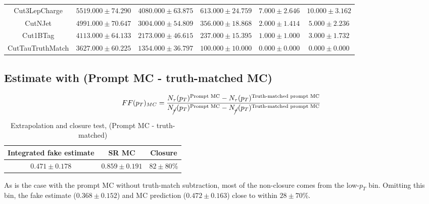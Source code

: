 \documentclass[11pt]{article}
\begin{document}
\begin{table}[htp]
{\begin{tabular}{|c|c|c|c|c|c|}
		Cut3LepCharge    &      $5519.000 \pm 74.290$ &      $4080.000 \pm 63.875$ &          $613.000 \pm 24.759$ &           $7.000 \pm 2.646$ &          $10.000 \pm 3.162$ \\
		CutNJet          &      $4991.000 \pm 70.647$ &      $3004.000 \pm 54.809$ &          $356.000 \pm 18.868$ &           $2.000 \pm 1.414$ &           $5.000 \pm 2.236$\\
		Cut1BTag         &      $4113.000 \pm 64.133$ &      $2173.000 \pm 46.615$ &          $237.000 \pm 15.395$ &           $1.000 \pm 1.000$ &           $3.000 \pm 1.732$ \\
		CutTauTruthMatch &      $3627.000 \pm 60.225$ &      $1354.000 \pm 36.797$ &          $100.000 \pm 10.000$ &           $0.000 \pm 0.000$ &           $0.000 \pm 0.000$ \\
		\hline
		\end{tabular}}
	\end{table}
	
	


	\clearpage
	\subsection{Estimate with (Prompt MC - truth-matched MC)} 
	\begin{equation}
		FF(p_T)_{MC} = \frac{N_\tau (p_T)^{\text{Prompt MC}} - N_\tau (p_T)^{\text{Truth-matched prompt MC}}}{N_{\cancel{\tau}} (p_T)^{\text{Prompt MC}} - N_{\cancel{\tau}} (p_T)^{\text{Truth-matched prompt MC}}}
	\end{equation}

	\begin{table}[htp]
	\caption{Extrapolation and closure test, (Prompt MC - truth-matched)}
	\begin{center}
	\begin{tabular}{|c|c|c|}
	\hline
	Integrated fake estimate	& SR MC	& Closure \\
	\hline
	$0.471\pm0.178$ 		& $0.859\pm0.191$ 		& $82\pm80$\% \\
	\hline
	\end{tabular}
	\end{center}
	\label{default}
	\end{table}%
	
	As is the case with the prompt MC without truth-match subtraction, most of the non-closure comes from the low-$p_T$ bin. Omitting this bin, the fake estimate ($0.368\pm0.152$) and MC prediction ($0.472\pm0.163$) close to within $28\pm70$\%. 
	
\end{document}
